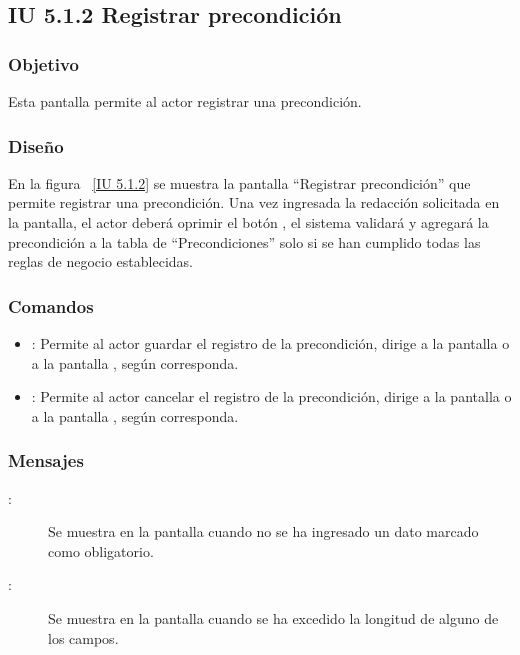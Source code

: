 \newpage 
\subsection{IU 5.1.2 Registrar precondición}

\subsubsection{Objetivo}
	
	Esta pantalla permite al actor registrar una precondición.

\subsubsection{Diseño}

    En la figura ~\ref{IU 5.1.2} se muestra la pantalla ``Registrar precondición'' que permite registrar una precondición.  
    Una vez ingresada la redacción solicitada en la pantalla, el actor deberá oprimir el botón 
    , el sistema validará y agregará la precondición a la tabla de ``Precondiciones'' solo si se han cumplido todas las reglas de negocio establecidas.  \\




\subsubsection{Comandos}
\begin{itemize}
	\item {}: Permite al actor guardar el registro de la precondición, dirige a la pantalla  o a la pantalla , según corresponda.
	\item {}: Permite al actor cancelar el registro de la precondición, dirige a la pantalla  o a la pantalla , según corresponda.
\end{itemize}

\subsubsection{Mensajes}

	
\begin{description}
	\item[ :] Se muestra en la pantalla  cuando no se ha ingresado un dato marcado como obligatorio.
	\item[ :] Se muestra en la pantalla  cuando se ha excedido la longitud de alguno de los campos.
\end{description}
